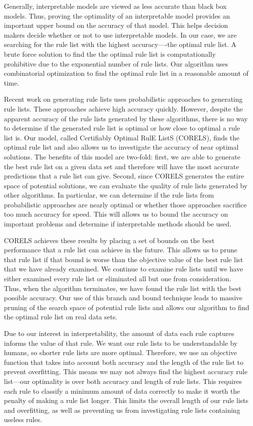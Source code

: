 Generally, interpretable models are viewed as less accurate than black box models.
Thus, proving the optimality of an interpretable model provides an important upper bound on the accuracy of that model.
This helps decision makers decide whether or not to use interpretable models.
In our case, we are searching for the rule list with the highest accuracy----the optimal rule list. 
A brute force solution to find the the optimal rule list is computationally prohibitive due to the exponential number of rule lists.
Our algorithm uses combinatorial optimization to find the optimal rule list in a reasonable amount of time.

Recent work on generating rule lists \cite{LethamRuMcMa15,YangRuSe16} uses probabilistic approaches to generating rule lists.
These approaches achieve high accuracy quickly.
However, despite the apparent accuracy of the rule lists generated by these algorithms, there is no way to determine if the generated rule list is optimal or how close to optimal a rule list is. 
Our model, called Certifiably Optimal RulE ListS (CORELS), finds the optimal rule list and also allows us to investigate the accuracy of near optimal solutions. 
The benefits of this model are two-fold: first, we are able to generate the best rule list on a given data set and therefore will have the most accurate predictions that a rule list can give.
Second, since CORELS generates the entire space of potential solutions, we can evaluate the quality of rule lists generated by other algorithms. 
In particular, we can determine if the rule lists from probabilistic approaches are nearly optimal or whether those approaches sacrifice too much accuracy for speed.
This will allows us to bound the accuracy on important problems and determine if interpretable methods should be used.

CORELS achieves these results by placing a set of bounds on the best performance that a rule list can achieve in the future. 
This allows us to prune that rule list if that bound is worse than the objective value of the best rule list that we have already examined.
We continue to examine rule lists until we have either examined every rule list or eliminated all but one from consideration. 
Thus, when the algorithm terminates, we have found the rule list with the best possible accuracy. 
Our use of this branch and bound technique leads to massive pruning of the search space of potential rule lists and allows our algorithm to find the optimal rule list on real data sets.

Due to our interest in interpretability, the amount of data each rule captures informs the value of that rule. 
We want our rule lists to be understandable by humans, so shorter rule lists are more optimal. 
Therefore, we use an objective function that takes into account both accuracy and the length of the rule list to prevent overfitting. 
This means we may not always find the highest accuracy rule list---our optimality is over both accuracy and length of rule lists.
This requires each rule to classify a minimum amount of data correctly to make it worth the penalty of making a rule list longer. 
This limits the overall length of our rule lists and overfitting, as well as preventing us from investigating rule lists containing useless rules.


